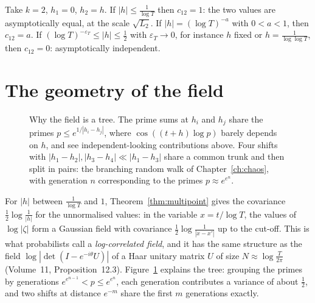 \begin{example}\label{exa:regimes}
Take $k=2$, $h_1=0$, $h_2=h$. If $|h|\le\frac1{\log T}$ then $c_{12}=1$: the two values are asymptotically equal, at the scale $\sqrt{L_2}$. If $|h|=(\log T)^{-a}$ with $0<a<1$, then $c_{12}=a$. If $(\log T)^{-\varepsilon_T}\le|h|\le\frac12$ with $\varepsilon_T\to0$, for instance $h$ fixed or $h=\frac1{\log\log T}$, then $c_{12}=0$: asymptotically independent.
\end{example}

\section{The geometry of the field}

\begin{figure}[ht]\centering
{}
\caption{Why the field is a tree. The prime sums at $h_i$ and $h_j$ share the primes $p\le e^{1/|h_i-h_j|}$, where $\cos((t+h)\log p)$ barely depends on $h$, and see independent-looking contributions above. Four shifts with $|h_1-h_2|,|h_3-h_4|\ll|h_1-h_3|$ share a common trunk and then split in pairs: the branching random walk of Chapter~\ref{ch:chaos}, with generation $n$ corresponding to the primes $p\approx e^{e^n}$.}
\label{fig:fieldtree}
\end{figure}

For $|h|$ between $\frac1{\log T}$ and $1$, Theorem~\ref{thm:multipoint} gives the covariance $\frac12\log\frac1{|h|}$ for the unnormalised values: in the variable $x=t/\log T$, the values of $\log|\zeta|$ form a Gaussian field with covariance $\frac12\log\frac1{|x-x'|}$ up to the cut-off. This is what probabilists call a \emph{log-correlated field}, and it has the same structure as the field $\log|\det(I-e^{-i\theta}U)|$ of a Haar unitary matrix $U$ of size $N\approx\log\frac T{2\pi}$ (Volume~11, Proposition~12.3). Figure~\ref{fig:fieldtree} explains the tree: grouping the primes by generations $e^{e^{n-1}}<p\le e^{e^n}$, each generation contributes a variance of about $\frac12$, and two shifts at distance $e^{-m}$ share the first $m$ generations exactly.

